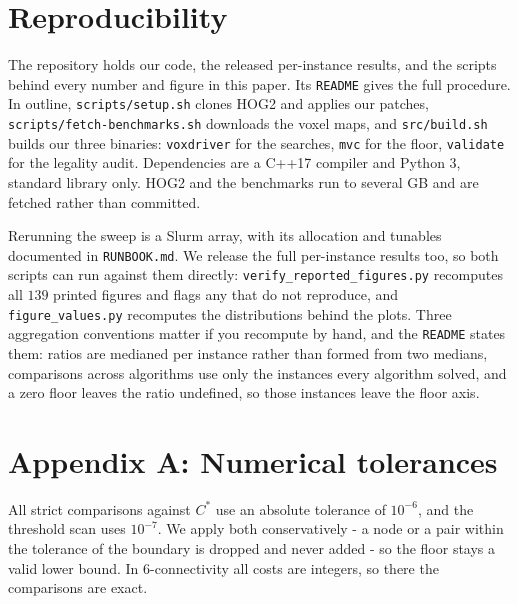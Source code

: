 \documentclass[letterpaper]{article} %
\begin{document}
\section{Reproducibility}
The repository holds our code, the released per-instance results, and the scripts behind every number and figure in this paper. Its \texttt{README} gives the full procedure. In outline, \texttt{scripts/setup.sh} clones HOG2 and applies our patches, \texttt{scripts/fetch-benchmarks.sh} downloads the voxel maps, and \texttt{src/build.sh} builds our three binaries: \texttt{voxdriver} for the searches, \texttt{mvc} for the floor, \texttt{validate} for the legality audit. Dependencies are a C++17 compiler and Python 3, standard library only. HOG2 and the benchmarks run to several GB and are fetched rather than committed.

Rerunning the sweep is a Slurm array, with its allocation and tunables documented in \texttt{RUNBOOK.md}. We release the full per-instance results too, so both scripts can run against them directly: \texttt{verify\_reported\_figures.py} recomputes all $139$ printed figures and flags any that do not reproduce, and \texttt{figure\_values.py} recomputes the distributions behind the plots. Three aggregation conventions matter if you recompute by hand, and the \texttt{README} states them: ratios are medianed per instance rather than formed from two medians, comparisons across algorithms use only the instances every algorithm solved, and a zero floor leaves the ratio undefined, so those instances leave the floor axis.




\section{Appendix A: Numerical tolerances}\label{app:a}
All strict comparisons against $C^*$ use an absolute tolerance of $10^{-6}$, and the threshold scan uses $10^{-7}$. We apply both conservatively - a node or a pair within the tolerance of the boundary is dropped and never added - so the floor stays a valid lower bound. In 6-connectivity all costs are integers, so there the comparisons are exact.
\end{document}
